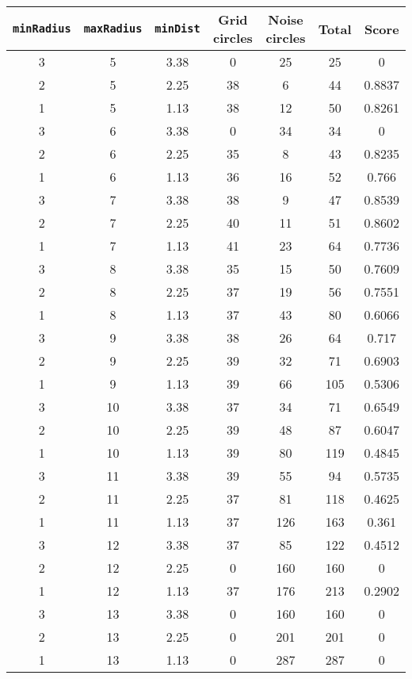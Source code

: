 \documentclass[letterpaper, 12pt]{article}
\begin{document}
\begin{longtable}{|c|c|c|c|c|c|c|}
\hline
\textbf{\texttt{minRadius}} & \textbf{\texttt{maxRadius}} & \textbf{\texttt{minDist}} & \textbf{Grid circles} & \textbf{Noise circles} & \textbf{Total} & \textbf{Score} \\
\hline
3 & 5 & 3.38 & 0 & 25 & 25 & 0 \\
\hline
2 & 5 & 2.25 & 38 & 6 & 44 & 0.8837 \\
\hline
1 & 5 & 1.13 & 38 & 12 & 50 & 0.8261 \\
\hline
3 & 6 & 3.38 & 0 & 34 & 34 & 0 \\
\hline
2 & 6 & 2.25 & 35 & 8 & 43 & 0.8235 \\
\hline
1 & 6 & 1.13 & 36 & 16 & 52 & 0.766 \\
\hline
3 & 7 & 3.38 & 38 & 9 & 47 & 0.8539 \\
\hline
2 & 7 & 2.25 & 40 & 11 & 51 & 0.8602 \\
\hline
1 & 7 & 1.13 & 41 & 23 & 64 & 0.7736 \\
\hline
3 & 8 & 3.38 & 35 & 15 & 50 & 0.7609 \\
\hline
2 & 8 & 2.25 & 37 & 19 & 56 & 0.7551 \\
\hline
1 & 8 & 1.13 & 37 & 43 & 80 & 0.6066 \\
\hline
3 & 9 & 3.38 & 38 & 26 & 64 & 0.717 \\
\hline
2 & 9 & 2.25 & 39 & 32 & 71 & 0.6903 \\
\hline
1 & 9 & 1.13 & 39 & 66 & 105 & 0.5306 \\
\hline
3 & 10 & 3.38 & 37 & 34 & 71 & 0.6549 \\
\hline
2 & 10 & 2.25 & 39 & 48 & 87 & 0.6047 \\
\hline
1 & 10 & 1.13 & 39 & 80 & 119 & 0.4845 \\
\hline
3 & 11 & 3.38 & 39 & 55 & 94 & 0.5735 \\
\hline
2 & 11 & 2.25 & 37 & 81 & 118 & 0.4625 \\
\hline
1 & 11 & 1.13 & 37 & 126 & 163 & 0.361 \\
\hline
3 & 12 & 3.38 & 37 & 85 & 122 & 0.4512 \\
\hline
2 & 12 & 2.25 & 0 & 160 & 160 & 0 \\
\hline
1 & 12 & 1.13 & 37 & 176 & 213 & 0.2902 \\
\hline
3 & 13 & 3.38 & 0 & 160 & 160 & 0 \\
\hline
2 & 13 & 2.25 & 0 & 201 & 201 & 0 \\
\hline
1 & 13 & 1.13 & 0 & 287 & 287 & 0 \\

\end{longtable}
\end{document}
